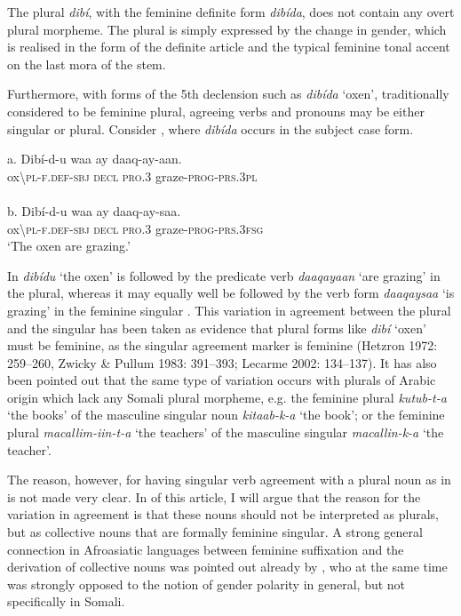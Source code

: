 \documentclass[output=paper]{langsci/langscibook}
\begin{document}
The plural \textit{dibí}, with the feminine definite form \textit{dibída}, does not contain any overt plural morpheme. The plural is simply expressed by the change in gender, which is realised in the form of the definite article and the typical feminine tonal accent on the last mora of the stem. 

Furthermore, with forms of the 5th declension such as \textit{dibída} ‘oxen’, traditionally considered to be feminine plural, agreeing verbs and pronouns may be either singular or plural. Consider , where \textit{dibída} occurs in the subject case form.

\ea
\ea
\gll \textup{a. } Dibí-d-u             waa  ay{\rmfnm}   daaq-ay-aan.   \\
        ox{\textbackslash}\textsc{pl-f.def-sbj  decl   pro.3}   graze-\textsc{prog-prs.3pl}\\
\ex
{}\\
\gll \textup{b.  }Dibí-d-u        waa  ay   daaq-ay-saa.    \\
       ox{\textbackslash}\textsc{pl-f.def-sbj  decl   pro.3}  graze-\textsc{prog-prs.3fsg}\\
\glt   ‘The oxen are grazing.’
\z
\z


In  \textit{dibídu} ‘the oxen’ is followed by the predicate verb \textit{daaqayaan} ‘are grazing’ in the plural, whereas it may equally well be followed by the verb form \textit{daaqaysaa} ‘is grazing’ in the feminine singular . This variation in agreement between the plural and the singular has been taken as evidence that plural forms like \textit{dibí} ‘oxen’ must be feminine, as the singular agreement marker is feminine (Hetzron 1972: 259{}--260, Zwicky \& Pullum 1983: 391{}--393; Lecarme 2002: 134{}--137). It has also been pointed out that the same type of variation occurs with plurals of Arabic origin which lack any Somali plural morpheme, e.g. the feminine plural \textit{kutub-t-a} ‘the books’ of the masculine singular noun \textit{kitaab-k-a} ‘the book’; or the feminine plural \textit{macallim-iin-t-a} ‘the teachers’ of the masculine singular \textit{macallin-k-a} ‘the teacher’.

The reason, however, for having singular verb agreement with a plural noun as in  is not made very clear. In  of this article, I will argue that the reason for the variation in agreement is that these nouns should not be interpreted as plurals, but as collective nouns that are formally feminine singular. A strong general connection in Afroasiatic languages between feminine suffixation and the derivation of collective nouns was pointed out already by \citet{Speiser1938}, who at the same time was strongly opposed to the notion of gender polarity in general, but not specifically in Somali.
\end{document}
